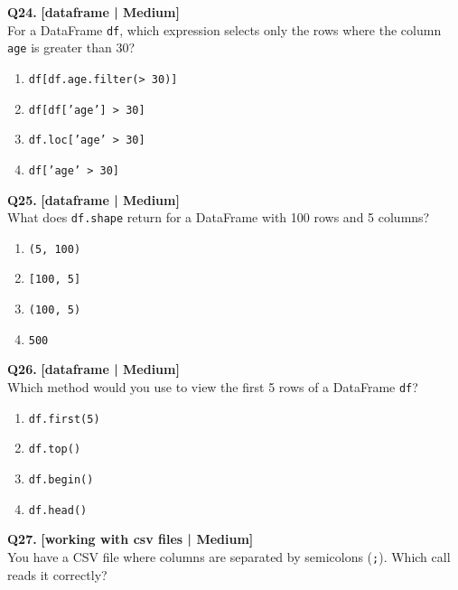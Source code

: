\noindent\textbf{Q24.} \hfill {\small\color{LPUOrange}\textbf{[dataframe | Medium]}}\\[2pt]
For a DataFrame \texttt{df}, which expression selects only the rows where the column \texttt{age} is greater than 30?

\begin{enumerate}[label=(\alph*),topsep=2pt,itemsep=1pt,partopsep=0pt,parsep=0pt]
    \item \relax \texttt{df[df.age.filter(> 30)]}
    \item \relax \texttt{df[df['age'] > 30]}
    \item \relax \texttt{df.loc['age' > 30]}
    \item \relax \texttt{df['age' > 30]}
\end{enumerate}
\vspace{2mm}

\noindent\textbf{Q25.} \hfill {\small\color{LPUOrange}\textbf{[dataframe | Medium]}}\\[2pt]
What does \texttt{df.shape} return for a DataFrame with 100 rows and 5 columns?

\begin{enumerate}[label=(\alph*),topsep=2pt,itemsep=1pt,partopsep=0pt,parsep=0pt]
    \item \relax \texttt{(5, 100)}
    \item \relax \texttt{[100, 5]}
    \item \relax \texttt{(100, 5)}
    \item \relax \texttt{500}
\end{enumerate}
\vspace{2mm}

\noindent\textbf{Q26.} \hfill {\small\color{LPUOrange}\textbf{[dataframe | Medium]}}\\[2pt]
Which method would you use to view the first 5 rows of a DataFrame \texttt{df}?

\begin{enumerate}[label=(\alph*),topsep=2pt,itemsep=1pt,partopsep=0pt,parsep=0pt]
    \item \relax \texttt{df.first(5)}
    \item \relax \texttt{df.top()}
    \item \relax \texttt{df.begin()}
    \item \relax \texttt{df.head()}
\end{enumerate}
\vspace{2mm}

\noindent\textbf{Q27.} \hfill {\small\color{LPUOrange}\textbf{[working with csv files | Medium]}}\\[2pt]
You have a CSV file where columns are separated by semicolons (\texttt{;}). Which call reads it correctly?


